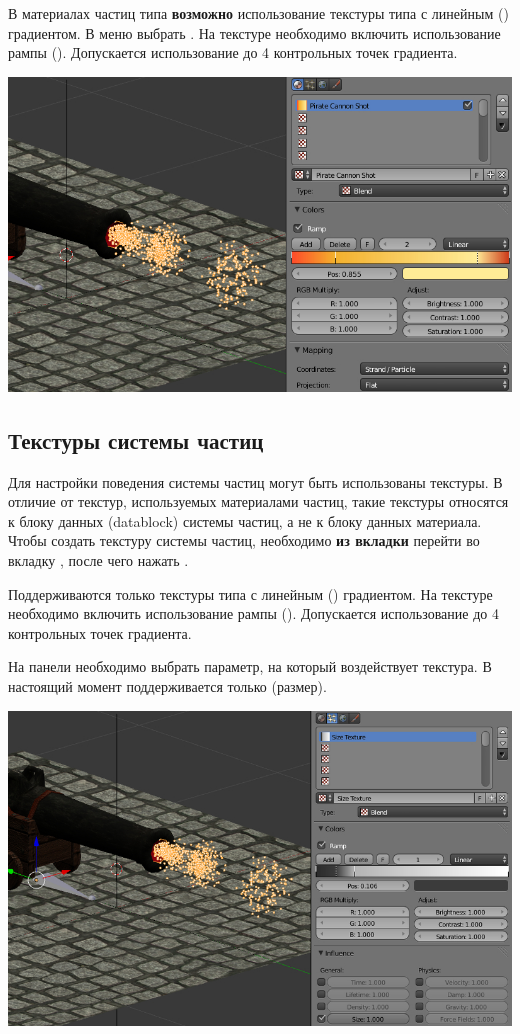 \documentclass[a4paper,12pt,oneside]{sphinxmanual}
\begin{document}
В материалах частиц типа  \textbf{возможно} использование текстуры типа  с линейным () градиентом. В меню  выбрать . На текстуре необходимо включить использование рампы (). Допускается использование до 4 контрольных точек градиента.

{\hfill\includegraphics[width=1.000\linewidth]{particles_settings_ramp_color.jpg}\hfill}


\subsection{Текстуры системы частиц}
\label{particles:id16}
Для настройки поведения системы частиц могут быть использованы текстуры. В отличие от текстур, используемых материалами частиц, такие текстуры относятся к блоку данных (datablock) системы частиц, а не к блоку данных материала. Чтобы создать текстуру системы частиц, необходимо \textbf{из вкладки}  перейти во вкладку , после чего нажать .

Поддерживаются только текстуры типа  с линейным () градиентом. На текстуре необходимо включить использование рампы (). Допускается использование до 4 контрольных точек градиента.

На панели  необходимо выбрать параметр, на который воздействует текстура. В настоящий момент поддерживается только  (размер).

{\hfill\includegraphics[width=1.000\linewidth]{particles_settings_ramp_size.jpg}\hfill}
\end{document}
